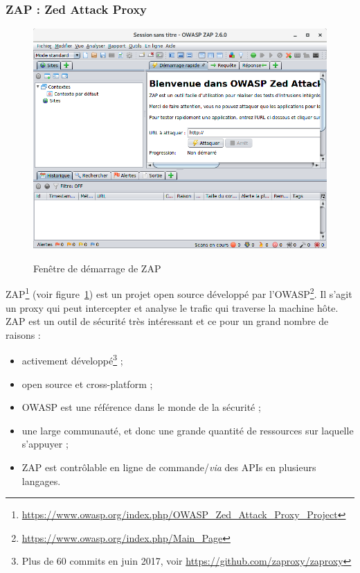 \subsubsection{ZAP : Zed Attack Proxy}
\begin{figure}
  {\includegraphics[width=\textwidth]{images/zap_acceuil}}
  \centering
  \caption{Fenêtre de démarrage de ZAP}
  \label{fig:zap_acceuil}
\end{figure}
ZAP\footnote{\url{https://www.owasp.org/index.php/OWASP_Zed_Attack_Proxy_Project}} (voir figure~\ref{fig:zap_acceuil}) est un projet open source développé par l'OWASP\footnote{\url{https://www.owasp.org/index.php/Main_Page}}. Il s'agit un proxy qui peut intercepter et analyse le trafic qui traverse la machine hôte. ZAP est un outil de sécurité très intéressant et ce pour un grand nombre de raisons :
\begin{itemize}[label=$\bullet$]
\item activement développé\footnote{Plus de 60 commits en juin 2017, voir \url{https://github.com/zaproxy/zaproxy}} ;
\item open source et cross-platform ;
\item OWASP est une référence dans le monde de la sécurité ;
\item une large communauté, et donc une grande quantité de ressources sur laquelle s'appuyer ;
\item ZAP est contrôlable en ligne de commande/\textit{via} des APIs en plusieurs langages.
\end{itemize}

